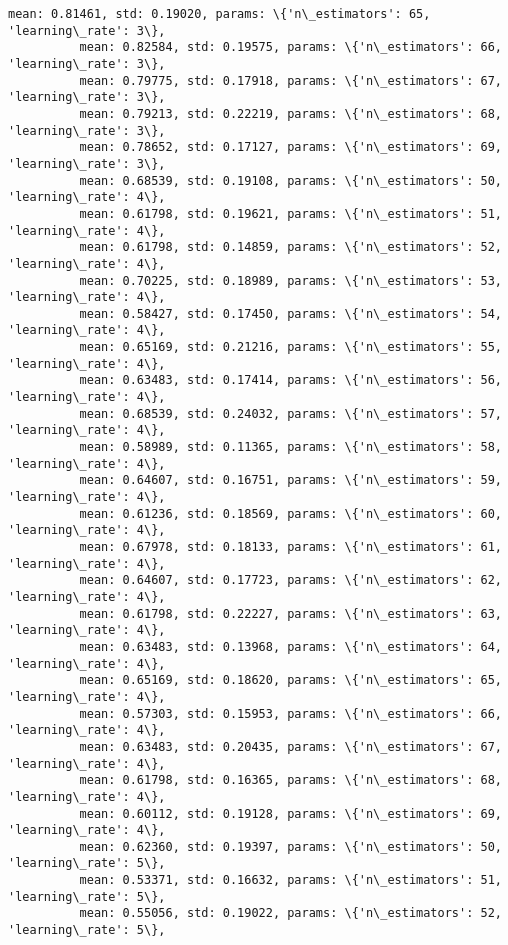 \documentclass[11pt]{article}
\begin{document}
\begin{Verbatim}[commandchars=\\\{\}]
          mean: 0.81461, std: 0.19020, params: \{'n\_estimators': 65, 'learning\_rate': 3\},
          mean: 0.82584, std: 0.19575, params: \{'n\_estimators': 66, 'learning\_rate': 3\},
          mean: 0.79775, std: 0.17918, params: \{'n\_estimators': 67, 'learning\_rate': 3\},
          mean: 0.79213, std: 0.22219, params: \{'n\_estimators': 68, 'learning\_rate': 3\},
          mean: 0.78652, std: 0.17127, params: \{'n\_estimators': 69, 'learning\_rate': 3\},
          mean: 0.68539, std: 0.19108, params: \{'n\_estimators': 50, 'learning\_rate': 4\},
          mean: 0.61798, std: 0.19621, params: \{'n\_estimators': 51, 'learning\_rate': 4\},
          mean: 0.61798, std: 0.14859, params: \{'n\_estimators': 52, 'learning\_rate': 4\},
          mean: 0.70225, std: 0.18989, params: \{'n\_estimators': 53, 'learning\_rate': 4\},
          mean: 0.58427, std: 0.17450, params: \{'n\_estimators': 54, 'learning\_rate': 4\},
          mean: 0.65169, std: 0.21216, params: \{'n\_estimators': 55, 'learning\_rate': 4\},
          mean: 0.63483, std: 0.17414, params: \{'n\_estimators': 56, 'learning\_rate': 4\},
          mean: 0.68539, std: 0.24032, params: \{'n\_estimators': 57, 'learning\_rate': 4\},
          mean: 0.58989, std: 0.11365, params: \{'n\_estimators': 58, 'learning\_rate': 4\},
          mean: 0.64607, std: 0.16751, params: \{'n\_estimators': 59, 'learning\_rate': 4\},
          mean: 0.61236, std: 0.18569, params: \{'n\_estimators': 60, 'learning\_rate': 4\},
          mean: 0.67978, std: 0.18133, params: \{'n\_estimators': 61, 'learning\_rate': 4\},
          mean: 0.64607, std: 0.17723, params: \{'n\_estimators': 62, 'learning\_rate': 4\},
          mean: 0.61798, std: 0.22227, params: \{'n\_estimators': 63, 'learning\_rate': 4\},
          mean: 0.63483, std: 0.13968, params: \{'n\_estimators': 64, 'learning\_rate': 4\},
          mean: 0.65169, std: 0.18620, params: \{'n\_estimators': 65, 'learning\_rate': 4\},
          mean: 0.57303, std: 0.15953, params: \{'n\_estimators': 66, 'learning\_rate': 4\},
          mean: 0.63483, std: 0.20435, params: \{'n\_estimators': 67, 'learning\_rate': 4\},
          mean: 0.61798, std: 0.16365, params: \{'n\_estimators': 68, 'learning\_rate': 4\},
          mean: 0.60112, std: 0.19128, params: \{'n\_estimators': 69, 'learning\_rate': 4\},
          mean: 0.62360, std: 0.19397, params: \{'n\_estimators': 50, 'learning\_rate': 5\},
          mean: 0.53371, std: 0.16632, params: \{'n\_estimators': 51, 'learning\_rate': 5\},
          mean: 0.55056, std: 0.19022, params: \{'n\_estimators': 52, 'learning\_rate': 5\},

\end{Verbatim}
\end{document}
